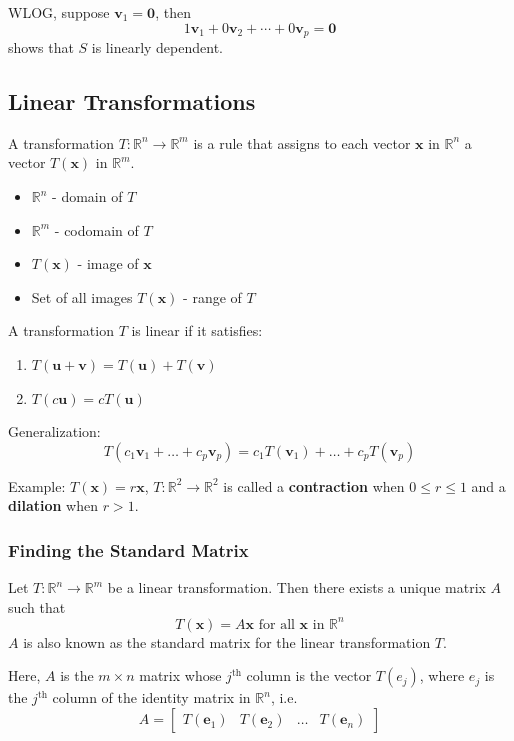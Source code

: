 \documentclass[../linear-algebra.tex]{subfiles}
\begin{document}
\smallskip
\noindent WLOG, suppose $\mathbf{v}_1 = \mathbf{0}$, then
\[1\mathbf{v}_1 + 0\mathbf{v}_2 +\cdots +0\mathbf{v}_p = \mathbf{0}\]
shows that $S$ is linearly dependent.

\subsection{Linear Transformations}
\noindent A transformation $T : \mathbb{R}^n \to \mathbb{R}^m$ is a rule that 
assigns to each vector $\mathbf{x}$ in $\mathbb{R}^n$ a vector $T(\mathbf{x})$ in $\mathbb{R}^m$.
\begin{itemize}
    \item $\mathbb{R}^n$ - domain of $T$
    \item $\mathbb{R}^m$ - codomain of $T$
    \item $T(\mathbf{x})$ - image of $\mathbf{x}$
    \item Set of all images $T(\mathbf{x})$ - range of $T$
\end{itemize}


\noindent A transformation $T$ is linear if it satisfies:
\begin{enumerate}
    \item $T(\mathbf{u} + \mathbf{v}) = T(\mathbf{u}) + T(\mathbf{v})$
    \item $T(c\mathbf{u}) = cT(\mathbf{u})$
\end{enumerate}
\noindent Generalization:
\[
T(c_1 \mathbf{v}_1 + \dots + c_p \mathbf{v}_p) = c_1 T(\mathbf{v}_1) + \dots + c_p T(\mathbf{v}_p)
\]

\noindent Example:
$T(\mathbf{x}) = r\mathbf{x}$, $T : \mathbb{R}^2 \to \mathbb{R}^2$ 
is called a \textbf{contraction} when $0 \leq r \leq 1$ and a \textbf{dilation} when $r > 1$.

\subsubsection{Finding the Standard Matrix}
Let $T:\mathbb{R}^n\rightarrow\mathbb{R}^m$ be a linear transformation.
Then there exists a unique matrix $A$ such that 
\[T(\mathbf{x}) = A\mathbf{x} \text{ for all } \mathbf{x} \text{ in } \mathbb{R}^n\]
$A$ is also known as the standard matrix for the linear transformation $T$.

\smallskip
\noindent Here, $A$ is the $m\times n$ matrix whose $j^{\text{th}}$ column is the 
vector $T(e_j)$, where $e_j$ is the $j^{\text{th}}$ column of the 
identity matrix in $\mathbb{R}^n$, i.e.
\[ A = \begin{bmatrix} T(\mathbf{e}_1) & T(\mathbf{e}_2) & \dots & T(\mathbf{e}_n) \end{bmatrix} \]
\end{document}
